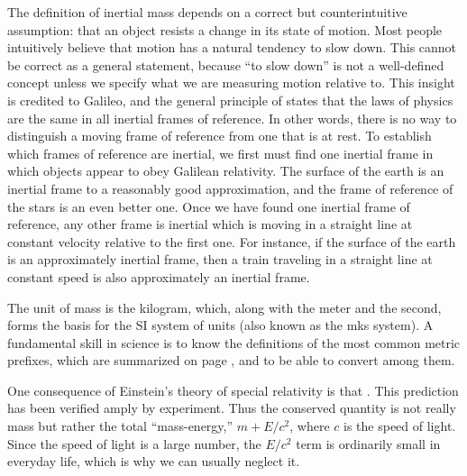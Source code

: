 	The definition of inertial mass depends on a correct but counterintuitive
	assumption: that an object resists a change in its state of motion. Most
	people intuitively believe that motion has a natural tendency to slow down.
	This cannot be correct as a general statement, because ``to slow down'' is
	not a well-defined concept unless we specify what we are measuring motion
	relative to. This insight is credited to Galileo, and the general principle
	of  states that the laws of physics are the same in all
	inertial frames of reference. In other words, there is no way to distinguish
	a moving frame of reference from one that is at rest. To establish which frames
	of reference are inertial, we first must find one inertial frame in which
	objects appear to obey Galilean relativity. The surface of the earth is
	an inertial frame to a reasonably good approximation, and the frame of reference
	of the stars is an even better one. Once we have found one inertial frame of
	reference, any other frame is inertial which is moving in a straight line
	at constant velocity relative to the first one. For instance, if the surface
	of the earth is an approximately inertial frame, then a train traveling
	in a straight line at constant speed is also approximately an inertial frame.
	
	The unit of mass is the kilogram, which, along with the meter and the second,
	forms the basis for the SI system of units (also known as the mks system).
	A fundamental skill in science is to know the definitions of the most common
	metric prefixes, which are summarized on page \pageref{metricprefixestable},
	and to be able to convert among them.
	
	One consequence of Einstein's theory of special relativity is that . This prediction has been verified
	amply by experiment. Thus the conserved quantity is not really mass
	but rather the total ``mass-energy,''
	$m+E/c^2$, where $c$ is the speed of light. Since the speed of light is a large
	number, the $E/c^2$ term is ordinarily small in everyday life, which is why
	we can usually neglect it.

